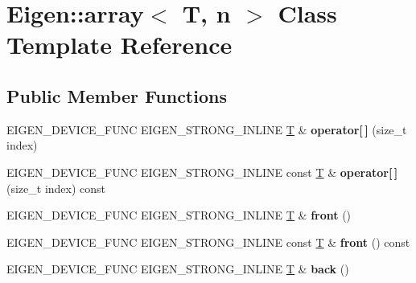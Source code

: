 \hypertarget{class_eigen_1_1array}{}\section{Eigen\+:\+:array$<$ T, n $>$ Class Template Reference}
\label{class_eigen_1_1array}
\subsection*{Public Member Functions}
\begin{DoxyCompactItemize}
\item 
\mbox{\label{class_eigen_1_1array_a0685bf062d0186b34a6cff47c953d7ef}} 
E\+I\+G\+E\+N\+\_\+\+D\+E\+V\+I\+C\+E\+\_\+\+F\+U\+NC E\+I\+G\+E\+N\+\_\+\+S\+T\+R\+O\+N\+G\+\_\+\+I\+N\+L\+I\+NE \hyperlink{group___sparse_core___module}{T} \& {\bfseries operator\mbox{[}$\,$\mbox{]}} (size\+\_\+t index)
\item 
\mbox{\label{class_eigen_1_1array_a773e8683e5b0875c4f708c68c5379cd0}} 
E\+I\+G\+E\+N\+\_\+\+D\+E\+V\+I\+C\+E\+\_\+\+F\+U\+NC E\+I\+G\+E\+N\+\_\+\+S\+T\+R\+O\+N\+G\+\_\+\+I\+N\+L\+I\+NE const \hyperlink{group___sparse_core___module}{T} \& {\bfseries operator\mbox{[}$\,$\mbox{]}} (size\+\_\+t index) const
\item 
\mbox{\label{class_eigen_1_1array_a8a1dd3892a6ed3f467f9028937364ff1}} 
E\+I\+G\+E\+N\+\_\+\+D\+E\+V\+I\+C\+E\+\_\+\+F\+U\+NC E\+I\+G\+E\+N\+\_\+\+S\+T\+R\+O\+N\+G\+\_\+\+I\+N\+L\+I\+NE \hyperlink{group___sparse_core___module}{T} \& {\bfseries front} ()
\item 
\mbox{\label{class_eigen_1_1array_a6aec8186a7e5238df83def54d6723d5c}} 
E\+I\+G\+E\+N\+\_\+\+D\+E\+V\+I\+C\+E\+\_\+\+F\+U\+NC E\+I\+G\+E\+N\+\_\+\+S\+T\+R\+O\+N\+G\+\_\+\+I\+N\+L\+I\+NE const \hyperlink{group___sparse_core___module}{T} \& {\bfseries front} () const
\item 
\mbox{\label{class_eigen_1_1array_a32c7d69554a18b05b6c7b52d9744ff5e}} 
E\+I\+G\+E\+N\+\_\+\+D\+E\+V\+I\+C\+E\+\_\+\+F\+U\+NC E\+I\+G\+E\+N\+\_\+\+S\+T\+R\+O\+N\+G\+\_\+\+I\+N\+L\+I\+NE \hyperlink{group___sparse_core___module}{T} \& {\bfseries back} ()
\item 

\end{DoxyCompactItemize}

